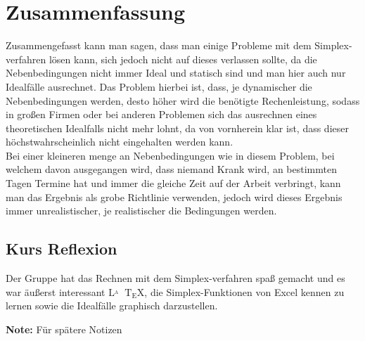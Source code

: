 \section{Zusammenfassung }

Zusammengefasst kann man sagen, dass man einige Probleme mit dem Simplex-verfahren lösen kann, sich jedoch nicht auf dieses verlassen sollte, da die Nebenbedingungen nicht immer Ideal und statisch sind und man hier auch nur Idealfälle ausrechnet. Das Problem hierbei ist, dass, je dynamischer die Nebenbedingungen werden, desto höher wird die benötigte Rechenleistung, sodass in großen Firmen oder bei anderen Problemen sich das ausrechnen eines theoretischen Idealfalls nicht mehr lohnt, da von vornherein klar ist, dass dieser höchstwahrscheinlich nicht eingehalten werden kann. \\
Bei einer kleineren menge an Nebenbedingungen wie in diesem Problem, bei welchem davon ausgegangen wird, dass niemand Krank wird, an bestimmten Tagen Termine hat und immer die gleiche Zeit auf der Arbeit verbringt, kann man das Ergebnis als grobe Richtlinie verwenden, jedoch wird dieses Ergebnis immer unrealistischer, je realistischer die Bedingungen werden.

\subsection{Kurs Reflexion}

Der Gruppe hat das Rechnen mit dem Simplex-verfahren spaß gemacht und es war äußerst interessant ${\displaystyle \mathrm {L\!\!^{{}_{A}}\!\!\!\!\!\;\;T\!_{\displaystyle E}\!X} }$, die Simplex-Funktionen von Excel kennen zu lernen sowie die Idealfälle graphisch darzustellen.

{\bf Note:} Für spätere Notizen